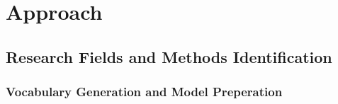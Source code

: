 \documentclass[runningheads]{llncs}
\begin{document}
\section{Approach}


\subsection{Research Fields and Methods Identification}
\subsubsection{Vocabulary Generation and Model Preperation}
\smallskip
\end{document}
